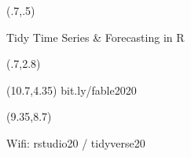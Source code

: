 {
\begin{textblock}{7.5}(.7,.5)\fontsize{24}{26}\sf
{\color[RGB]{73,129,175}\raggedright{}\par Tidy Time Series \& Forecasting in R}
\end{textblock}
\begin{textblock}{7.5}(.7,2.8)
{\fontsize{15}{15}\sf\color{Orange}\raggedright{\insertauthor}}
\end{textblock}
\begin{textblock}{7.5}(10.7,4.35)
{\fontsize{9}{9}\sf\color{Orange}bit.ly/fable2020}
\end{textblock}
\begin{textblock}{3.25}(9.35,8.7)
\fontsize{8}{8}\sf%
\begin{block}{}%
Wifi: rstudio20 / tidyverse20%
\end{block}%
\end{textblock}}